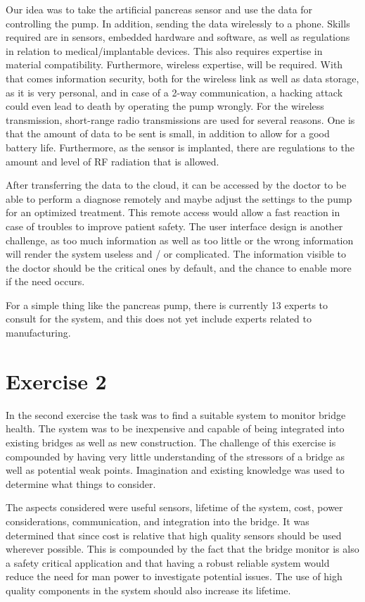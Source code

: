 \documentclass[english,12pt,a4paper,pdftex,elec,utf8]{aaltothesis}
\begin{document}
	Our idea was to take the artificial pancreas sensor and use the data for controlling the pump. In addition, sending the data wirelessly to a phone. Skills required are in sensors, embedded hardware and software, as well as regulations in relation to medical/implantable devices. This also requires expertise in material compatibility. Furthermore, wireless expertise, will be required. With that comes information security, both for the wireless link as well as data storage, as it is very personal, and in case of a 2-way communication, a hacking attack could even lead to death by operating the pump wrongly. For the wireless transmission, short-range radio transmissions are used for several reasons. One is that the amount of data to be sent is small, in addition to allow for a good battery life. Furthermore, as the sensor is implanted, there are regulations to the amount and level of RF radiation that is allowed. 

	After transferring the data to the cloud, it can be accessed by the doctor to be able to perform a diagnose remotely and maybe adjust the settings to the pump for an optimized treatment. This remote access would allow a fast reaction in case of troubles to improve patient safety. The user interface design is another challenge, as too much information as well as too little or the wrong information will render the system useless and / or complicated. The information visible to the doctor should be the critical ones by default, and the chance to enable more if the need occurs. 
	
	For a simple thing like the pancreas pump, there is currently 13 experts to consult for the system, and this does not yet include experts related to manufacturing.  


\newpage


\section*{Exercise 2}

	In the second exercise the task was to find a suitable system to monitor bridge health. The system was to be inexpensive and capable of being integrated into existing bridges as well as new construction. The challenge of this exercise is compounded by having very little understanding of the stressors of a bridge as well as potential weak points. Imagination and existing knowledge was used to determine what things to consider.
	
	The aspects considered were useful sensors, lifetime of the system, cost, power considerations, communication, and integration into the bridge. It was determined that since cost is relative that high quality sensors should be used wherever possible. This is compounded by the fact that the bridge monitor is also a safety critical application and that having a robust reliable system would reduce the need for man power to investigate potential issues. The use of high quality components in the system should also increase its lifetime. 
	
\end{document}
